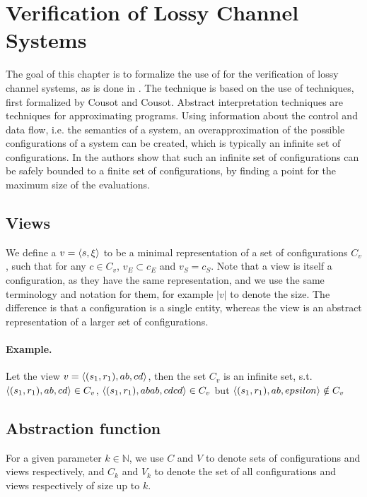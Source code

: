 \newpage
\section{Verification of Lossy Channel Systems}
\label{model}
The goal of this chapter is to formalize the use of  for the verification of lossy channel systems, as is done in \cite{parosh}. The technique is based on the use of  techniques, first formalized by Cousot and Cousot\cite{cousot1977}. Abstract interpretation techniques are techniques for approximating programs. Using information about the control and data flow, i.e. the semantics of a system, an overapproximation of the possible configurations of a system can be created, which is typically an infinite set of configurations. In \cite{parosh} the authors show that such an infinite set of configurations can be safely bounded to a finite set of configurations, by finding a  point for the maximum size of the evaluations.


\subsection{Views}
\label{subwords}
We define a  $v= \langle s, \xi\rangle$ to be a minimal representation of a set of configurations $C_v$, such that for any $c \in C_v$, $v_E \subset c_E$ and $v_S = c_S$. Note that a view is itself a configuration, as they have the same representation, and we use the same terminology and notation for them, for example $|v|$ to denote the size. The difference is that a configuration is a single entity, whereas the view is an abstract representation of a larger set of configurations.

\paragraph{Example.} Let the view $v = \langle(s_1, r_1), ab, cd\rangle$, then the set $C_v$ is an infinite set, s.t. $\langle(s_1, r_1), ab, cd\rangle \in C_v$, $\langle(s_1, r_1), abab, cdcd\rangle \in C_v$ but $\langle(s_1, r_1), ab, epsilon\rangle \notin C_v$


\subsection{Abstraction function}
\label{alphagamma}
For a given parameter $k \in \mathbb{N}$, we use $C$ and $V$ to denote sets of configurations and views respectively, and $C_k$ and $V_k$ to denote the set of all configurations and views respectively of size up to $k$.

